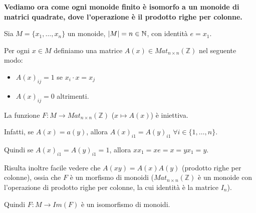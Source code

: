\documentclass[../main.tex]{subfiles}
\begin{document}
\textbf{Vediamo ora come ogni monoide finito è isomorfo a un monoide di matrici quadrate, dove l'operazione
    è il prodotto righe per colonne.}

Sia $M=\{x_1,\ldots,x_n\}$ un monoide, $\lvert M\rvert = n \in \mathbb{N}$, con identità $e = x_1$.

Per ogni $x \in M$ definiamo una matrice $A(x) \in Mat_{n \times n}(\mathbb{Z})$ nel seguente modo:
\begin{itemize}
    \item $A(x)_{ij} = 1$ se $x_i \cdot x = x_j$
    \item $A(x)_{ij} = 0$ altrimenti.
\end{itemize}
La funzione $F : M \rightarrow Mat_{n \times n} (\mathbb{Z})$ ($x \mapsto A(x)$) è iniettiva.

Infatti, se $A(x) = a(y)$, allora $A(x)_{i1} = A(y)_{i1} \; \forall i \in \{1,\ldots,n\}$.

Quindi se $A(x)_{i1} = A(y)_{i1} = 1$, allora $xx_1 = xe = x = yx_1 = y$.

Risulta inoltre facile vedere che $A(xy) = A(x)A(y)$ (prodotto righe per colonne), ossia che $F$ è un morfismo di monoidi ($Mat_{n \times n}(\mathbb{Z})$ è un monoide con l'operazione di prodotto righe per colonne, la cui identità è la matrice $I_n$).

Quindi $F: M \rightarrow Im(F)$ è un isomorfismo di monoidi.
\end{document}
